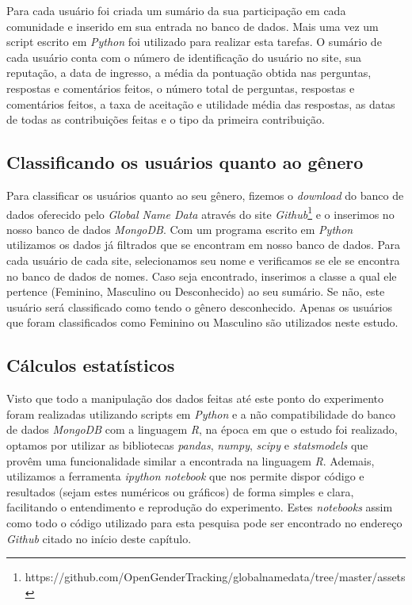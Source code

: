 Para cada usuário foi criada um sumário da sua participação em cada comunidade e inserido em sua entrada no banco de dados. Mais uma vez um script escrito em \emph{Python} foi utilizado para realizar esta tarefas. O sumário de cada usuário conta com o número de identificação do usuário no site, sua reputação, a data de ingresso, a média da pontuação obtida nas perguntas, respostas e comentários feitos, o número total de perguntas, respostas e comentários feitos, a taxa de aceitação e utilidade média das respostas, as datas de todas as contribuições feitas e o tipo da primeira contribuição.

\subsection{Classificando os usuários quanto ao gênero}

Para classificar os usuários quanto ao seu gênero, fizemos o \emph{download} do banco de dados oferecido pelo \emph{Global Name Data} através do site \emph{Github}\footnote{https://github.com/OpenGenderTracking/globalnamedata/tree/master/assets} e o inserimos no nosso banco de dados \emph{MongoDB}. Com um programa escrito em \emph{Python} utilizamos os dados já filtrados que se encontram em nosso banco de dados. Para cada usuário de cada site, selecionamos seu nome e verificamos se ele se encontra no banco de dados de nomes. Caso seja encontrado, inserimos a classe a qual ele pertence (Feminino, Masculino ou Desconhecido) ao seu sumário. Se não, este usuário será classificado como tendo o gênero desconhecido. Apenas os usuários que foram classificados como Feminino ou Masculino são utilizados neste estudo.

\subsection{Cálculos estatísticos}

Visto que todo a manipulação dos dados feitas até este ponto do experimento foram realizadas utilizando scripts em \emph{Python} e a não compatibilidade do banco de dados \emph{MongoDB} com a linguagem \emph{R}, na época em que o estudo foi realizado, optamos por utilizar as bibliotecas \emph{pandas}, \emph{numpy}, \emph{scipy} e \emph{statsmodels} que provêm uma funcionalidade similar a encontrada na linguagem \emph{R}. Ademais, utilizamos a ferramenta \emph{ipython notebook} que nos permite dispor código e resultados (sejam estes numéricos ou gráficos) de forma simples e clara, facilitando o entendimento e reprodução do experimento. Estes \emph{notebooks} assim como todo o código utilizado para esta pesquisa pode ser encontrado no endereço \emph{Github} citado no início deste capítulo.

